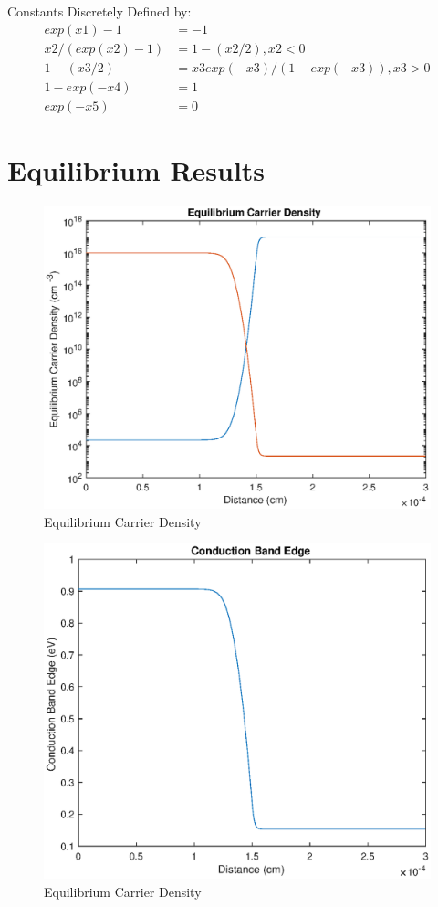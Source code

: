 \documentclass[12pt]{article}
\begin{document}
Constants Discretely Defined by:
\begin{align}
exp(x1)-1&=-1
\\
x2/(exp(x2)-1)&=1-(x2/2), x2<0
\\
1-(x3/2)&=x3exp(-x3)/(1-exp(-x3)), x3>0
\\
1-exp(-x4)&=1
\\
exp(-x5)&=0
\end{align}

\section{Equilibrium Results}
\begin{figure}
    \centering
    \includegraphics{EqCarrierDensity}
    \caption{Equilibrium Carrier Density}
\end{figure} 
\begin{figure}
    \centering
    \includegraphics{EqConductionBandEdge}
    \caption{Equilibrium Carrier Density}
\end{figure} 
\end{document}
